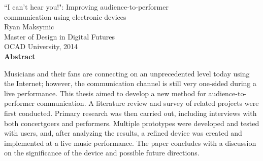 \begin{center}
{``I can't hear you!": Improving audience-to-performer\\communication using electronic devices\\[0.25cm]
Ryan Maksymic\\[0.25cm]
Master of Design in Digital Futures\\[0.25cm]
OCAD University, 2014\\[0.75cm]
\large\textbf{Abstract}}\\
\end{center}

Musicians and their fans are connecting on an unprecedented level today using the Internet; however, the communication channel is still very one-sided during a live performance. This thesis aimed to develop a new method for audience-to-performer communication. A literature review and survey of related projects were first conducted. Primary research was then carried out, including interviews with both concertgoers and performers. Multiple prototypes were developed and tested with users, and, after analyzing the results, a refined device was created and implemented at a live music performance. The paper concludes with a discussion on the significance of the device and possible future directions.
